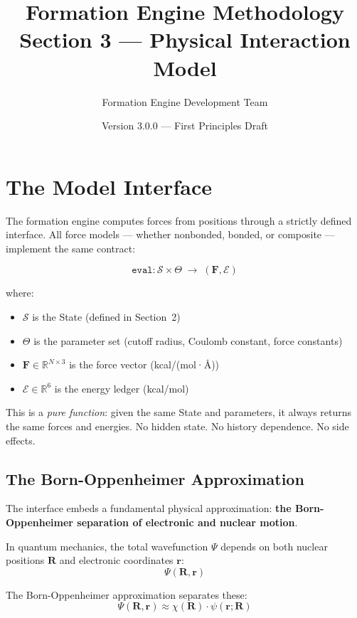 \documentclass[11pt]{article}
\title{\textbf{Formation Engine Methodology} \\
\Large Section 3 — Physical Interaction Model}
\author{Formation Engine Development Team}
\date{Version 3.0.0 — First Principles Draft}
\begin{document}
\maketitle

\section{The Model Interface}

The formation engine computes forces from positions through a strictly defined interface. All force models — whether nonbonded, bonded, or composite — implement the same contract:

\begin{equation}
\texttt{eval}: \mathcal{S} \times \Theta \;\longrightarrow\; (\mathbf{F}, \mathcal{E})
\end{equation}

where:
\begin{itemize}
\item $\mathcal{S}$ is the State (defined in Section~2)
\item $\Theta$ is the parameter set (cutoff radius, Coulomb constant, force constants)
\item $\mathbf{F} \in \mathbb{R}^{N \times 3}$ is the force vector (kcal/(mol·\AA))
\item $\mathcal{E} \in \mathbb{R}^6$ is the energy ledger (kcal/mol)
\end{itemize}

This is a \textit{pure function}: given the same State and parameters, it always returns the same forces and energies. No hidden state. No history dependence. No side effects.

\subsection{The Born-Oppenheimer Approximation}

The interface embeds a fundamental physical approximation: \textbf{the Born-Oppenheimer separation of electronic and nuclear motion}.

In quantum mechanics, the total wavefunction $\Psi$ depends on both nuclear positions $\mathbf{R}$ and electronic coordinates $\mathbf{r}$:
\begin{equation}
\Psi(\mathbf{R}, \mathbf{r})
\end{equation}

The Born-Oppenheimer approximation separates these:
\begin{equation}
\Psi(\mathbf{R}, \mathbf{r}) \approx \chi(\mathbf{R}) \cdot \psi(\mathbf{r}; \mathbf{R})
\end{equation}
\end{document}
